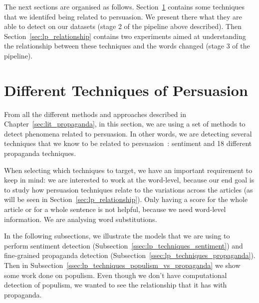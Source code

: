 
The next sections are organised as follows. Section~\ref{sec:lp_techniques} contains some techniques that we identifed being related to persuasion. We present there what they are able to detect on our datasets (stage 2 of the pipeline above described). Then Section~\ref{sec:lp_relationship} contains two experiments aimed at understanding the relationship between these techniques and the words changed (stage 3 of the pipeline).

\section{Different Techniques of Persuasion}
\label{sec:lp_techniques}


From all the different methods and approaches described in Chapter~\ref{sec:lit_propaganda}, in this section, we are using a set of methods to detect phenomena related to persuasion. %
In other words, we are detecting several techniques that we know 
to be related to persuasion~\cite{gass2018persuasion}: sentiment and 18 different propaganda techniques.%

When selecting which techniques to target, we have an important requirement to keep in mind: we are interested to work at the word-level, because our end goal is to study how persuasion techniques relate to the variations across the articles (as will be seen in Section~\ref{sec:lp_relationship}). Only having a score for the whole article or for a whole sentence is not helpful, because we need word-level information. We are analysing word substitutions.

In the following subsections, we illustrate the models that we are using to perform sentiment detection (Subsection~\ref{ssec:lp_techniques_sentiment}) and fine-grained propaganda detection (Subsection~\ref{ssec:lp_techniques_propaganda}).
Then in Subsection~\ref{ssec:lp_techniques_populism_vs_propaganda} we show some work done on populism. Even though we don't have computational detection of populism, we wanted to see the relationship that it has with propaganda.

